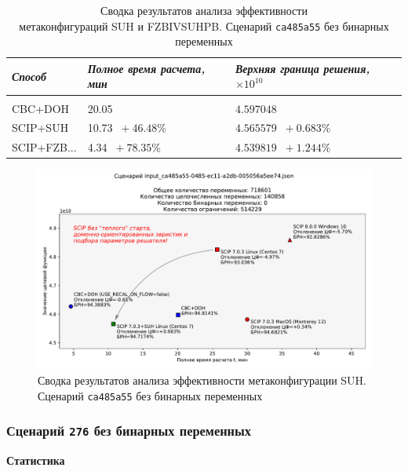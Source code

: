 \documentclass[%
	11pt,
	a4paper,
	utf8,
		]{article}
\begin{document}
{
	\begin{table}[!h]
		\centering
		\caption{Сводка результатов анализа эффективности \\метаконфигураций SUH и FZBIVSUHPB. Сценарий \texttt{ca485a55} без бинарных переменных}
		\begin{tabular}{ p{2.5cm} p{3.3cm} p{3.4cm} }
			\emph{Способ} & \emph{Полное время расчета, мин} & \emph{Верхняя граница решения, $ \times 10^{10} $} \\
			\hline\hline\\[-3.5mm]
			{CBC+DOH} & 20.05 & $ 4.597048 $ \\
			\hline
			SCIP+SUH & 10.73 {\color{blue} $\ +46.48 $\%} & $ 4.565579 $ {\color{blue} $\ +0.683 $\%} \\
			\hline
			SCIP+FZB... & 4.34 {\color{blue} $\ +78.35 $\%} & $ 4.539819 $ {\color{blue} $\ +1.244 $\%} \\
		\end{tabular}\label{tab:ca485a55_wo_bins}
	\end{table}
}

\begin{figure}[!h]
	\centering
	\includegraphics[scale=0.6]{figures/summary_ca485a55.pdf}
	\caption{Сводка результатов анализа эффективности метаконфигурации SUH. \\Сценарий \texttt{ca485a55} без бинарных переменных}\label{fig:summary_ca485a55}
\end{figure}

\subsubsection{Сценарий \texttt{276} без бинарных переменных}

\textbf{Статистика}\vspace*{1mm}
\end{document}
